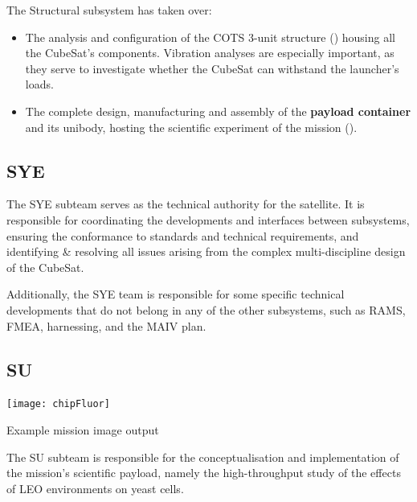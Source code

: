 \documentclass[a4paper,nobib,final]{tufte-book}
\begin{document}
The Structural subsystem has taken over:
\begin{itemize}
	\item The analysis and configuration of the \ac{COTS} 3-unit structure () housing all the CubeSat's components. Vibration analyses are especially important, as they serve to investigate whether the CubeSat can withstand the launcher's loads.
	\item The complete design, manufacturing and assembly of the \textbf{payload container} and its unibody, hosting the scientific experiment of the mission ().
\end{itemize}

\subsection{\acf{SYE}}

The \acl{SYE} subteam serves as the technical authority for the satellite. It is responsible for coordinating the developments and interfaces between subsystems, ensuring the conformance to standards and technical requirements, and identifying \& resolving all issues arising from the complex multi-discipline design of the CubeSat.

Additionally, the \ac{SYE} team is responsible for some specific technical developments that do not belong in any of the other subsystems, such as \ac{RAMS}, \ac{FMEA}, harnessing, and the \ac{MAIV} plan.

\subsection{\acf{SU}}
\label{sec:su}
\begin{marginfigure}
	\texttt{[image: chipFluor]}
	\caption[Example mission image output]{Example mission image output \parencite{DDJF_PL}}
	\label{fig:chip_fluor}
\end{marginfigure}

The \acl{SU} subteam is responsible for the conceptualisation and implementation of the mission's scientific payload, namely the high-throughput study of the effects of \ac{LEO} environments on yeast cells.
\end{document}
